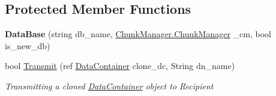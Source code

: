\subsection*{Protected Member Functions}
\begin{DoxyCompactItemize}
\item 
\hypertarget{class_dwarf_d_b_1_1_data_structures_1_1_data_base_ab2fe1cc1e8d59bbc68ad1f996507c4ee}{{\bfseries Data\+Base} (string db\+\_\+name, \hyperlink{class_dwarf_d_b_1_1_chunk_manager_1_1_chunk_manager}{Chunk\+Manager.\+Chunk\+Manager} \+\_\+cm, bool is\+\_\+new\+\_\+db)}\label{class_dwarf_d_b_1_1_data_structures_1_1_data_base_ab2fe1cc1e8d59bbc68ad1f996507c4ee}

\item 
bool \hyperlink{class_dwarf_d_b_1_1_data_structures_1_1_data_base_a5eefaebdb94adf4d3b19f29e8f146725}{Transmit} (ref \hyperlink{class_dwarf_d_b_1_1_data_structures_1_1_data_container}{Data\+Container} clone\+\_\+dc, String dn\+\_\+name)
\begin{DoxyCompactList}\small\item\em Transmitting a cloned \hyperlink{class_dwarf_d_b_1_1_data_structures_1_1_data_container}{Data\+Container} object to Recipient \end{DoxyCompactList}\end{DoxyCompactItemize}
